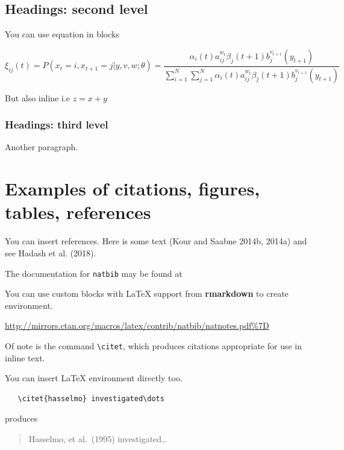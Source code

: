 \documentclass{article}
\begin{document}
\subsection{Headings: second level}\label{headings-second-level}

You can use equation in blocks

\[
\xi _{ij}(t)=P(x_{t}=i,x_{t+1}=j|y,v,w;\theta)= {\frac {\alpha _{i}(t)a^{w_t}_{ij}\beta _{j}(t+1)b^{v_{t+1}}_{j}(y_{t+1})}{\sum _{i=1}^{N} \sum _{j=1}^{N} \alpha _{i}(t)a^{w_t}_{ij}\beta _{j}(t+1)b^{v_{t+1}}_{j}(y_{t+1})}}
\]

But also inline i.e \(z=x+y\)

\subsubsection{Headings: third level}\label{headings-third-level}

Another paragraph.

\section{Examples of citations, figures, tables,
references}\label{examples-of-citations-figures-tables-references}

\label{sec:others}

You can insert references. Here is some text (Kour and Saabne 2014b,
2014a) and see Hadash et al. (2018).

The documentation for \verb+natbib+ may be found at

You can use custom blocks with LaTeX support from \textbf{rmarkdown} to
create environment.

\begin{center}
\url{http://mirrors.ctan.org/macros/latex/contrib/natbib/natnotes.pdf\%7D}

\end{center}

Of note is the command \verb+\citet+, which produces citations
appropriate for use in inline text.

You can insert LaTeX environment directly too.

\begin{verbatim}
   \citet{hasselmo} investigated\dots
\end{verbatim}

produces

\begin{quote}
  Hasselmo, et al.\ (1995) investigated\dots
\end{quote}
\end{document}

